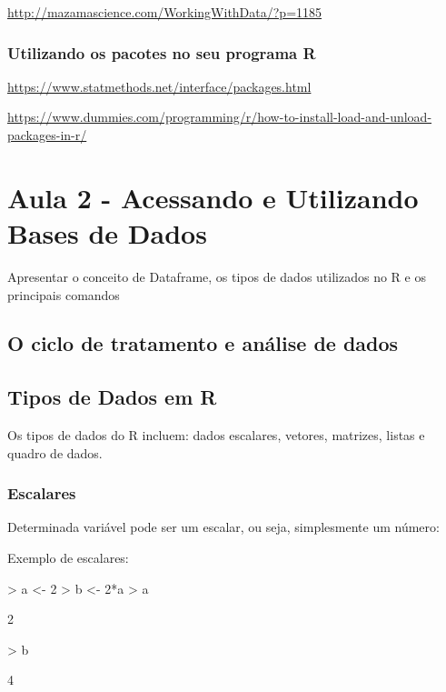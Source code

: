 \documentclass[12pt,a4paper,oneside]{erdc}
\begin{document}
\url{http://mazamascience.com/WorkingWithData/?p=1185}


\subsection{Utilizando os pacotes no seu programa R}

\url{https://www.statmethods.net/interface/packages.html}

\url{https://www.dummies.com/programming/r/how-to-install-load-and-unload-packages-in-r/}






%
%


%
%
%


		
\chapter{Aula 2 - Acessando e Utilizando Bases de Dados}

Apresentar o conceito de Dataframe, os tipos de dados utilizados no R e os principais comandos  

\section{O ciclo de tratamento e análise de dados}

\section{Tipos de Dados em R}

Os tipos de dados do R incluem: dados escalares, vetores, matrizes, listas e quadro de dados.

\subsection{Escalares}
Determinada variável pode ser um escalar, ou seja, simplesmente um número:

Exemplo de escalares:
\begin{Schunk}
\begin{Sinput}
> a <- 2
> b <- 2*a
> a
\end{Sinput}
\begin{Soutput}
[1] 2
\end{Soutput}
\begin{Sinput}
> b
\end{Sinput}
\begin{Soutput}
[1] 4
\end{Soutput}
\end{Schunk}
\end{document}
